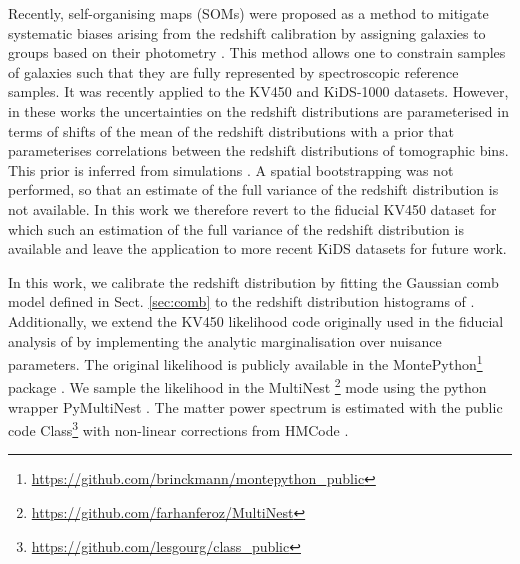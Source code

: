 \documentclass{aa}
\begin{document}
Recently, self-organising maps (SOMs) were proposed as a method to mitigate systematic biases arising from the redshift calibration by assigning galaxies to groups based on their photometry \citep{buchs, wright_som}. This method allows one to constrain samples of galaxies such that they are fully represented by spectroscopic reference samples. It was recently applied to the KV450 \citep{wright_som_kv450} and KiDS-1000 \citep{hildebrandt20, asgari20} datasets. However, in these works the uncertainties on the redshift distributions are parameterised in terms of shifts of the mean of the redshift distributions with a prior that parameterises correlations between the redshift distributions of tomographic bins. This prior is inferred from simulations \citep{wright_som, hildebrandt20, vdBusch20}. A spatial bootstrapping was not performed, so that an estimate of the full variance of the redshift distribution is not available. In this work we therefore revert to the fiducial KV450 dataset for which such an estimation of the full variance of the redshift distribution is available and leave the application to more recent KiDS datasets for future work.

In this work, we calibrate the redshift distribution by fitting the Gaussian comb model defined in Sect. \ref{sec:comb} to the redshift distribution histograms of \cite{hildebrandt18}. Additionally, we extend the KV450 likelihood code originally used in the fiducial analysis of \cite{hildebrandt18} by implementing the analytic marginalisation over nuisance parameters. The original likelihood is publicly available in the {\sc MontePython}\footnote{\url{https://github.com/brinckmann/montepython_public}} package \citep{Audren:2012wb, Brinckmann:2018cvx}. We sample the likelihood in the {\sc MultiNest} \footnote{\url{https://github.com/farhanferoz/MultiNest}} mode \citep{feroz09,feroz19} using the python wrapper {\sc PyMultiNest} \citep{buchner14}. The matter power spectrum is estimated with the public code {\sc Class}\footnote{\url{https://github.com/lesgourg/class_public}}\citep{blas11} with non-linear corrections from {\sc HMCode} \citep{mead15}. 
\end{document}
